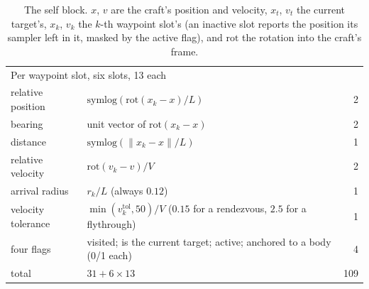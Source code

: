 \begin{table}[htbp]
\begin{tabular}{p{4.3cm}p{6.6cm}r}
\multicolumn{3}{l}{Per waypoint slot, six slots, 13 each} \\
relative position & $\mathrm{symlog}(\mathrm{rot}(x_k - x)/L)$ & 2 \\
bearing & unit vector of $\mathrm{rot}(x_k - x)$ & 2 \\
distance & $\mathrm{symlog}(\lVert x_k - x\rVert/L)$ & 1 \\
relative velocity & $\mathrm{rot}(v_k - v)/V$ & 2 \\
arrival radius & $r_k/L$ (always $0.12$) & 1 \\
velocity tolerance & $\min(v^{\mathrm{tol}}_k, 50)/V$ ($0.15$ for a rendezvous, $2.5$ for a flythrough) & 1 \\
four flags & visited; is the current target; active; anchored to a body (0/1 each) & 4 \\
\midrule
total & $31 + 6 \times 13$ & 109 \\
\bottomrule
\end{tabular}
\caption{The self block. $x$, $v$ are the craft's position and velocity, $x_t$,
$v_t$ the current target's, $x_k$, $v_k$ the $k$-th waypoint slot's (an
inactive slot reports the position its sampler left in it, masked by the
active flag), and $\mathrm{rot}$ the rotation into the craft's frame.}
\label{tab:obs-self}
\end{table}

